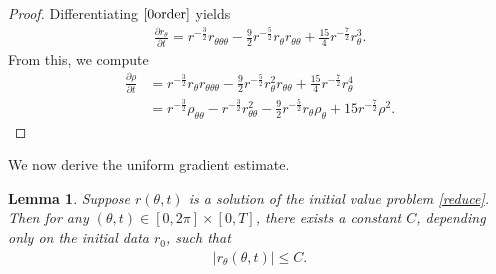 \documentclass[reqno,11pt, letterpaper]{amsart}
\theoremstyle{plain}
\newtheorem{lem}[thm]{Lemma}
\theoremstyle{definition}
\numberwithin{equation}{section}
\begin{document}
\begin{proof}
	Differentiating $\eqref{0order}$ yields
	\begin{align}\label{1order}
		\frac{\partial r_\theta}{\partial t}= r^{-\frac{3}{2}} r_{\theta\theta\theta}-\frac{9}{2} r^{-\frac{5}{2}} r_\theta r_{\theta\theta}+\frac{15}{4} r^{-\frac{7}{2}} r_\theta^3.
	\end{align}
	From this, we compute
	\begin{align*}
		\frac{\partial\rho}{\partial t}&= r^{-\frac{3}{2}} r_\theta r_{\theta\theta\theta}-\frac{9}{2} r^{-\frac{5}{2}} r_\theta^2 r_{\theta\theta}+\frac{15}{4} r^{-\frac{7}{2}} r_\theta^4\\
		&= r^{-\frac{3}{2}}\rho_{\theta\theta}- r^{-\frac{3}{2}} r_{\theta\theta}^2-\frac{9}{2} r^{-\frac{5}{2}} r_\theta\rho_\theta+15 r^{-\frac{7}{2}}\rho^2.
	\end{align*}
\end{proof}
We now derive the uniform gradient estimate.
\begin{lem}\label{C1}
	Suppose $ r(\theta,t)$ is a solution of the initial value problem \eqref{reduce}.  Then for any  $(\theta,t)\in[0,2\pi]\times[0,T]$, there exists a constant $C$, depending only on the initial data $ r_0$, such that
	\begin{align*}
		\lvert r_\theta(\theta,t)\rvert\le C.
	\end{align*}
\end{lem}
\end{document}
